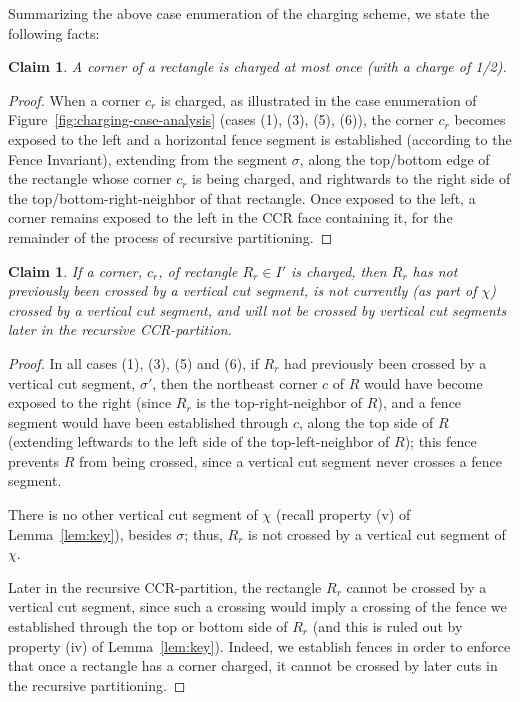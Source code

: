 \documentclass{article}
\newtheorem{claim}[theorem]{Claim}
\begin{document}
Summarizing the above case enumeration of the charging scheme, we
state the following facts:

\begin{claim}\label{fact2}
A corner of a rectangle is charged at most once (with a charge of 1/2).
\end{claim}

\begin{proof}
  When a corner $c_r$ is charged, as illustrated in the case
  enumeration of Figure~\ref{fig:charging-case-analysis} (cases (1),
  (3), (5), (6)), the corner $c_r$ becomes exposed to the left and a
  horizontal fence segment is established (according to the Fence
  Invariant), extending from the segment $\sigma$, along the top/bottom edge
  of the rectangle whose corner $c_r$ is being charged, and rightwards
  to the right side of the top/bottom-right-neighbor of that rectangle.  Once
  exposed to the left, a corner remains exposed to the left in the CCR
  face containing it, for the remainder of the process of recursive
  partitioning.
\end{proof}

\begin{claim}
  \label{fact3}
  If a corner, $c_r$, of rectangle
  $R_r\in I'$ is charged, then $R_r$ has not previously been crossed
  by a vertical cut segment, is not currently (as part of $\chi$)
  crossed by a vertical cut segment, and will not be crossed by
  vertical cut segments later in the recursive CCR-partition.
\end{claim}

\begin{proof}
  In all cases (1), (3), (5) and (6), if $R_r$ had previously been crossed
  by a vertical cut segment, $\sigma'$, then the northeast corner $c$
  of $R$ would have become exposed to the right (since $R_r$ is the
  top-right-neighbor of $R$), and a fence segment would have been
  established through $c$, along the top side of $R$ (extending
  leftwards to the left side of the top-left-neighbor of $R$); this
  fence prevents $R$ from being crossed, since a vertical cut segment
  never crosses a fence segment.

  There is no other vertical cut segment of $\chi$ (recall property (v) of Lemma~\ref{lem:key}), besides $\sigma$; thus, $R_r$ is
  not crossed by a vertical cut segment of $\chi$.

  Later in the recursive CCR-partition, the rectangle $R_r$ cannot be
  crossed by a vertical cut segment, since such a crossing would imply
  a crossing of the fence we established through the top or bottom 
  side of $R_r$ (and this is ruled out by property (iv) of
  Lemma~\ref{lem:key}). Indeed, we establish fences in order to enforce
  that once a rectangle has a corner charged, it cannot be crossed by
  later cuts in the recursive partitioning.
\end{proof}
\end{document}
